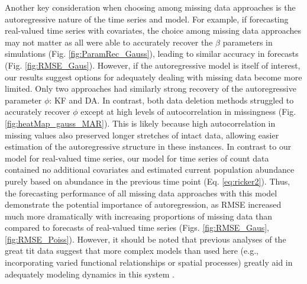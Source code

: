 \documentclass[12pt,english]{article} %
\begin{document}
\begin{linenumbers}
\begin{spacing}{1.9}
\begin{flushleft}

\hspace{1em} Another key consideration when choosing among missing data approaches is the autoregressive nature of the time series and model. For example, if forecasting real-valued time series with covariates, the choice among missing data approaches may not matter as all were able to accurately recover the $\beta$ parameters in simulations (Fig. \ref{fig:ParamRec_Gauss}), leading to similar accuracy in forecasts (Fig. \ref{fig:RMSE_Gaus}). However, if the autoregressive model is itself of interest, our results suggest options for adequately dealing with missing data become more limited. Only two approaches had similarly strong recovery of the autoregressive parameter $\phi$: KF and DA. In contrast, both data deletion methods struggled to accurately recover $\phi$ except at high levels of autocorrelation in missingness (Fig. \ref{fig:heatMap_gauss_MAR}). This is likely because high autocorrelation in missing values also preserved longer stretches of intact data, allowing easier estimation of the autoregressive structure in these instances. In contrast to our model for real-valued time series, our model for time series of count data contained no additional covariates and estimated current population abundance purely based on abundance in the previous time point (Eq. \ref{eq:ricker2}). Thus, the forecasting performance of all missing data approaches with this model demonstrate the potential importance of autoregression, as RMSE increased much more dramatically with increasing proportions of missing data than compared to forecasts of real-valued time series (Figs. \ref{fig:RMSE_Gaus}, \ref{fig:RMSE_Poiss}). However, it should be noted that previous analyses of the great tit data suggest that more complex models than used here (e.g., incorporating varied functional relationships or spatial processes) greatly aid in adequately modeling dynamics in this system \citep{lebreton1990modelling}.


\end{flushleft}
\end{spacing}
\end{linenumbers}
\end{document}
